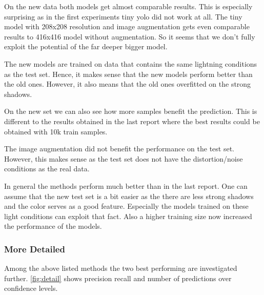 \documentclass{article}
\begin{document}
%

On the new data both models get almost comparable results. This is especially surprising as in the first experiments tiny yolo did not work at all. The tiny model with 208x208 resolution and image augmentation gets even comparable results to 416x416 model without augmentation. So it seems that we  don't fully exploit the potential of the far deeper bigger model.

The new models are trained on data that contains the same lightning conditions as the test set. Hence, it makes sense that the new models perform better than the old ones. However, it also means that the old ones overfitted on the strong shadows. 

On the new set we can also see how more samples benefit the prediction. This is different to the results obtained in the last report where the best results could be obtained with 10k train samples.

The image augmentation did not benefit the performance on the test set. However, this makes sense as the test set does not have the distortion/noise conditions as the real data.

In general the methods perform much better than in the last report. One can assume that the new test set is a bit easier as the there are less strong shadows and the color serves as a good feature. Especially the models trained on these light conditions can exploit that fact. Also a higher training size now increased the performance of the models.

\subsubsection{More Detailed}

Among the above listed methods the two best performing are investigated further. \autoref{fig:detail} shows precision recall and number of predictions over confidence levels.
	
\end{document}
